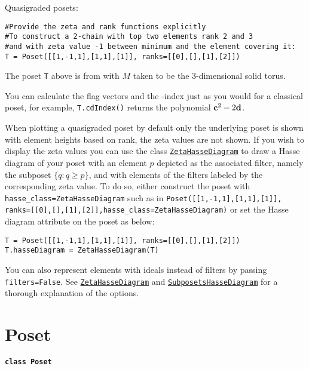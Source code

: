 \documentclass[12pt]{article}
\begin{document}
{{Quasigraded posets:
\begin{verbatim}
#Provide the zeta and rank functions explicitly
#To construct a 2-chain with top two elements rank 2 and 3
#and with zeta value -1 between minimum and the element covering it:
T = Poset([[1,-1,1],[1,1],[1]], ranks=[[0],[],[1],[2]])
\end{verbatim}
The poset \verb|T| above is from \cite[Example 6.14]{ehrenborg-goresky-readdy-15} with $M$ taken to
be the 3-dimensional solid torus.

You can calculate the flag vectors and the \cv\dv-index just as you would for a classical poset,
for example, \verb|T.cdIndex()| returns the polynomial $\textup{\textbf{c}}^2-2\textup{\textbf{d}}$.

When plotting a quasigraded poset by default only the underlying poset is shown with element heights
based on rank, the zeta values are not shown. If you wish to display the zeta values you can use
the class \hyperlink{ZetaHasseDiagram}{\texttt{ZetaHasseDiagram}} to draw a Hasse diagram of your poset with an element $p$ depicted as
the associated filter, namely the subposet $\{q:q\ge p\}$, and with elements of the filters labeled by the
corresponding zeta value. To do so, either construct the poset with \verb|hasse_class=ZetaHasseDiagram|
such as in \verb|Poset([[1,-1,1],[1,1],[1]], ranks=[[0],[],[1],[2]],hasse_class=ZetaHasseDiagram)| or
set the Hasse diagram attribute on the poset as below:
\begin{verbatim}
T = Poset([[1,-1,1],[1,1],[1]], ranks=[[0],[],[1],[2]])
T.hasseDiagram = ZetaHasseDiagram(T)
\end{verbatim}
You can also represent elements with ideals instead of filters by passing \verb|filters=False|.
See \hyperlink{ZetaHasseDiagram}{\texttt{ZetaHasseDiagram}} and \hyperlink{SubposetsHasseDiagram}{\texttt{SubposetsHasseDiagram}} for a thorough explanation of the options.

}\endlist}


\section{Poset}
\label{Poset}

\textbf{\hypertarget{Poset}{\Large \texttt{class Poset}}}
\end{document}
